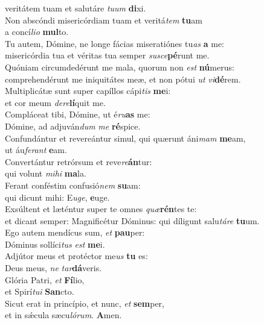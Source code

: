 \oddverse veritátem tuam et salutáre \textit{tu}\textit{um} \textbf{di}xi.\\
\evenverse Non abscóndi misericórdiam tuam et veritá\textit{tem} \textbf{tu}am~\*\\
\evenverse a concí\textit{li}\textit{o} \textbf{mul}to.\\
\oddverse Tu autem, Dómine, ne longe fácias miseratiónes tu\textit{as} \textbf{a} me:~\*\\
\oddverse misericórdia tua et véritas tua semper \textit{su}\textit{sce}\textbf{pé}runt me.\\
\evenverse Quóniam circumdedérunt me mala, quorum non \textit{est} \textbf{nú}merus:~\*\\
\evenverse comprehendérunt me iniquitátes meæ, et non pótui \textit{ut} \textit{vi}\textbf{dé}rem.\\
\oddverse Multiplicátæ sunt super capíllos cápi\textit{tis} \textbf{me}i:~\*\\
\oddverse et cor meum \textit{de}\textit{re}\textbf{lí}quit me.\\
\evenverse Compláceat tibi, Dómine, ut é\textit{ru}\textbf{as} me:~\*\\
\evenverse Dómine, ad adjuván\textit{dum} \textit{me} \textbf{ré}spice.\\
\oddverse Confundántur et revereántur simul, qui quærunt áni\textit{mam} \textbf{me}am,~\*\\
\oddverse ut áu\textit{fe}\textit{rant} \textbf{e}am.\\
\evenverse Convertántur retrórsum et reve\textit{re}\textbf{án}tur:~\*\\
\evenverse qui volunt \textit{mi}\textit{hi} \textbf{ma}la.\\
\oddverse Ferant conféstim confusió\textit{nem} \textbf{su}am:~\*\\
\oddverse qui dicunt mihi: E\textit{u}\textit{ge}, \textbf{e}uge.\\
\evenverse Exsúltent et læténtur super te omnes \textit{quæ}\textbf{rén}tes te:~\*\\
\evenverse et dicant semper: Magnificétur Dóminus: qui díligunt salu\textit{tá}\textit{re} \textbf{tu}um.\\
\oddverse Ego autem mendícus sum, \textit{et} \textbf{pau}per:~\*\\
\oddverse Dóminus sollíci\textit{tus} \textit{est} \textbf{me}i.\\
\evenverse Adjútor meus et protéctor me\textit{us} \textbf{tu} es:~\*\\
\evenverse Deus meus, \textit{ne} \textit{tar}\textbf{dá}veris.\\
\oddverse Glória Patri, \textit{et} \textbf{Fí}lio,~\*\\
\oddverse et Spirí\textit{tu}\textit{i} \textbf{San}cto.\\
\evenverse Sicut erat in princípio, et nunc, \textit{et} \textbf{sem}per,~\*\\
\evenverse et in sǽcula sæcu\textit{ló}\textit{rum}. \textbf{A}men.\\
